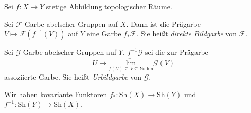 \documentclass[11pt]{book}
\theoremstyle{nonumberbreak}
\newenvironment{bemdefin}[1][]{\ifthenelse{\equal{#1}{}}{\bemdefini}{\bemdefini[#1]}\rm}{\endbemdefini}
\begin{document}
\begin{spacing}{1.4}
\begin{bemdefin}
Sei $f: X \longrightarrow Y$ stetige Abbildung topologischer Räume.
\begin{compactenum}
\item Sei $\mathcal{F}$ Garbe abelscher Gruppen auf $X$. Dann ist die Prägarbe $V \mapsto \mathcal{F}\left(f^{-1}(V)\right)$ auf $Y$ eine Garbe $f_{*}\mathcal{F}$. Sie heißt \textit{direkte Bildgarbe} von $\mathcal{F}$.
\item Sei $\mathcal{G}$ Garbe abelscher Gruppen auf $Y$. $f^{-1}\mathcal{G}$ sei die zur Prägarbe $$U \mapsto \underset{f(U) \subseteq V \subseteq Y \textrm{offen}}{\underrightarrow{\textrm{lim}}} \mathcal{G}(V)$$ assoziierte Garbe. Sie heißt \textit{Urbildgarbe} von $\mathcal{G}$.
\item Wir haben kovariante Funktoren $f_{*}: \underline{\textrm{Sh}}(X) \longrightarrow \underline{\textrm{Sh}}(Y)$ und $f^{-1}: \underline{\textrm{Sh}}(Y) \longrightarrow \underline{\textrm{Sh}}(X)$.
\end{compactenum}


\end{bemdefin}
\end{spacing}
\end{document}
